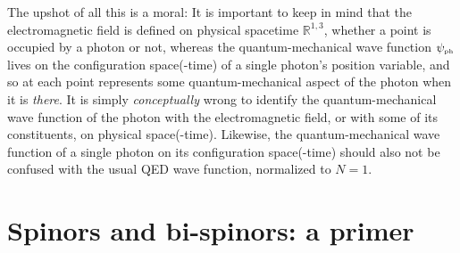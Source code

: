 \documentclass[11pt]{article}
\theoremstyle{definition}
\numberwithin{equation}{section}
\newcommand{\psiPH}{{\psi_{\mbox{\rm\tiny ph}}}}
\newcommand{\Rset}{{\mathbb R}}
\begin{document}
 The upshot of all this is a moral: 
 It is important to keep in mind that the electromagnetic field is defined on physical spacetime $\Rset^{1,3}$, 
whether a point is occupied by a photon or not, whereas the quantum-mechanical wave function $\psiPH$ lives 
on the configuration space(-time) of a single photon's position variable, and so at each point represents some 
quantum-mechanical aspect of the photon when it is \emph{there}.
 It is simply \emph{conceptually} wrong to identify the quantum-mechanical wave function of the photon with the electromagnetic field,
or with some of its constituents, on physical space(-time).
 Likewise, the quantum-mechanical wave function of a single photon on its configuration space(-time) should also not be confused 
with the usual QED wave function, normalized to $N=1$.

\section{Spinors and bi-spinors: a primer}

\label{app:primer}
%
\end{document}
